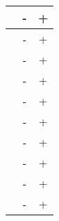 \begin{center}
\begin{supertabular}{|c|c|c|}
          &         -       &          +          \\ \hline
{}            &         -       &          +          \\ \hline
{}           &         -       &          +         \\ \hline
{}   &         -       &          +     \\ \hline
{}            &         -       &          +          \\ \hline
{}      &         -       &          +      \\ \hline
{}                  &         -       &          +         \\ \hline
{}                   &         -       &          +          \\ \hline
{}                  &         -       &          +         \\ \hline
{}                  &         -       &          +         \\ \hline
\hline
\end{supertabular}
\end{center}
